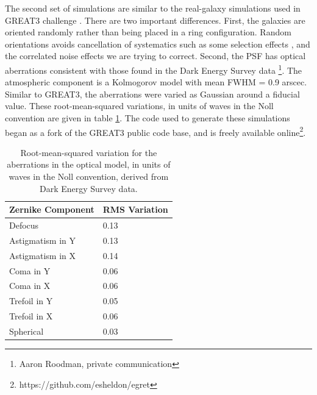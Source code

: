 \documentclass[usegraphicx,usenatbib]{mn2e}
\begin{document}
The second set of simulations are similar to the real-galaxy simulations used
in GREAT3 challenge \citep{great3}.  There are two important differences.
First, the galaxies are oriented randomly rather than being placed in a ring
configuration.  Random orientations avoids cancellation of systematics such as
some selection effects \citep{DESSVShear}, and the correlated noise effects we
are trying to correct.  Second, the PSF has optical aberrations consistent with
those found in the Dark Energy Survey data \footnote{Aaron Roodman, private
communication}.  The atmospheric component is a Kolmogorov model with mean FWHM =
0.9 arscec.  Similar to GREAT3, the aberrations were varied as Gaussian around
a fiducial value. These root-mean-squared variations, in units of waves in the
Noll convention are given in table \ref{tab:aberr}.  The code used to generate
these simulations began as a fork of the GREAT3 public code base, and is freely
available online\footnote{https://github.com/esheldon/egret}.

\begin{table}
    \centering
    \caption{Root-mean-squared variation for the aberrations in the optical model,
        in units of waves in the Noll convention, derived 
    from Dark Energy Survey data. \label{tab:aberr}}
    \begin{tabular}{ | l | l | }
        Zernike Component  & RMS Variation \\
        \hline
        Defocus & 0.13 \\
        Astigmatism in Y & 0.13 \\
        Astigmatism in X & 0.14 \\
        Coma in Y & 0.06 \\
        Coma in X & 0.06 \\
        Trefoil in Y & 0.05 \\
        Trefoil in X & 0.06 \\
        Spherical & 0.03 \\

    \end{tabular}
\end{table}
\end{document}

